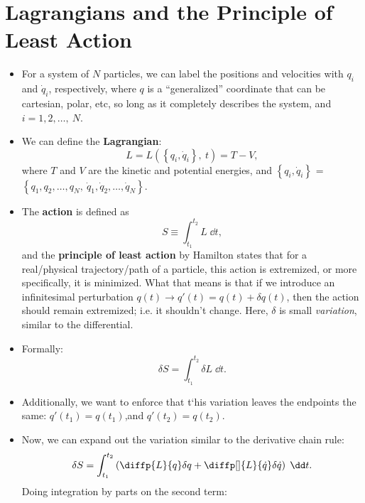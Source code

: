 \section{Lagrangians and the Principle of Least Action}

\begin{itemize}
    \item For a system of $N$ particles, we can label the positions and velocities with $q_i$ and $\dot{q}_i$, respectively, where $q$ is a ``generalized'' coordinate that can be cartesian, polar, etc, so long as it completely describes the system, and $i = 1,2,\ldots,\ N$.
    \item We can define the \textbf{Lagrangian}:
        \begin{equation}
            L = L(\left\{q_i,\dot{q}_i\right\},\ t) = T-V,
        \end{equation}
        where $T$ and $V$ are the kinetic and potential energies, and $\left\{q_i,\dot{q}_i\right\}$ = $\left\{q_1,q_2,\ldots, q_N,\ \dot{q}_1,\dot{q}_2,\ldots, \dot{q}_N\right\}$.
    \item The \textbf{action} is defined as
        \begin{equation}
            S \equiv \int_{t_1}^{t_2} L \;\dd t,
        \end{equation}
        and the \textbf{principle of least action} by Hamilton states that for a real/physical trajectory/path of a particle, this action is extremized, or more specifically, it is minimized. What that means is that if we introduce an infinitesimal perturbation $q(t) \rightarrow q'(t) = q(t) + \delta q(t)$, then the action should remain extremized; i.e. it shouldn't change. Here, $\delta$ is small \textit{variation}, similar to the differential.
    \item Formally:
        \begin{equation}
            \delta S = \int_{t_1}^{t_2} \delta L \;\dd t.
        \end{equation}
    \item Additionally, we want to enforce that t`his variation leaves the endpoints the same: $q'(t_1) = q(t_1)$,and $q'(t_2) = q(t_2)$.
    \item Now, we can expand out the variation similar to the derivative chain rule:
        \begin{equation*}
            \delta S = \int_{t_1}^{t_2} \left(\diffp{L}{q}\delta q + \diffp[]{L}{\dot{q}}\delta\dot{q}\right) \;\dd t.
        \end{equation*}
        Doing integration by parts on the second term:

\end{itemize}
